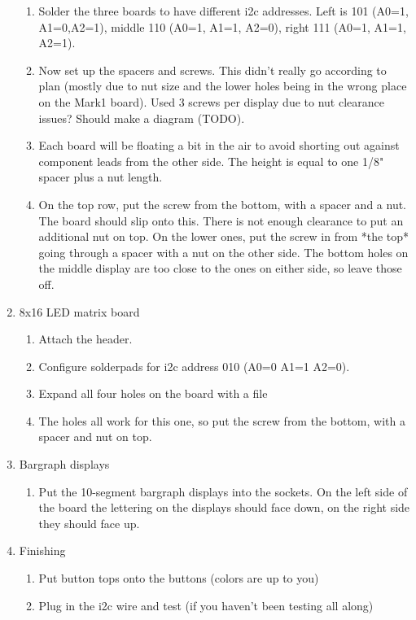 \documentclass[11pt]{article}
\begin{document}
\begin{enumerate}
\begin{enumerate}
		\item Solder the three boards to have different i2c addresses.
			Left is 101 (A0=1, A1=0,A2=1), 
			middle 110 (A0=1, A1=1, A2=0),
			right 111 (A0=1, A1=1, A2=1).
			

		\item Now set up the spacers and screws.  
			This didn't really go according
			to plan (mostly due to nut size and the lower holes being in the
			wrong place on the Mark1 board).
			Used 3 screws per display due to nut clearance issues?
			Should make a diagram (TODO).

		\item Each board will be floating a bit in the air to avoid shorting out
			against component leads from the other side.
			The height is equal to one 1/8" spacer plus a nut length.  

		\item On the top row, put the screw from the bottom, with a spacer and a nut.
			The board should slip onto this.
			There is not enough clearance to put an additional nut on top.
			On the lower ones, put the screw in from *the top* going through 
			a spacer with a nut on the other side.
			The bottom holes on the middle display are too close to the ones
			on either side, so leave those off.

	\end{enumerate}

\item 8x16 LED matrix board
	\begin{enumerate}

	\item	Attach the header.
	\item   Configure solderpads for i2c address 010
		(A0=0 A1=1 A2=0).
	\item   Expand all four holes on the board with a file
	\item   The holes all work for this one, so put the screw
		from the bottom, with a spacer and nut on top.
	\end{enumerate}


\item Bargraph displays
	\begin{enumerate}

	\item	Put the 10-segment bargraph displays into the sockets.
		On the left side of the board the lettering on the displays should
		face down, on the right side they should face up.
	\end{enumerate}

\item Finishing
	\begin{enumerate}

	\item	Put button tops onto the buttons (colors are up to you)

	\item	Plug in the i2c wire and test (if you haven't been testing all along)
	\end{enumerate}


\end{enumerate}
\end{document}
